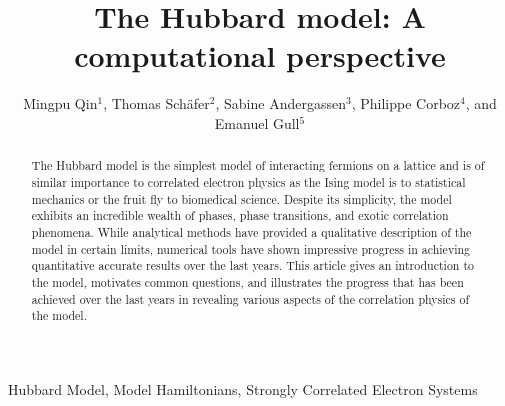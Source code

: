 \documentclass{ar-1col}
\begin{document}

\title{The Hubbard model: A computational perspective}


\author{Mingpu Qin$^1$, Thomas Sch{\"a}fer$^2$, Sabine Andergassen$^3$, Philippe Corboz$^4$, and Emanuel Gull$^5$
}


\begin{abstract}
The Hubbard model is the simplest model of interacting fermions on a lattice and is of similar importance to correlated electron physics as the Ising model is to statistical mechanics or the fruit fly to biomedical science.
Despite its simplicity, the model exhibits an incredible wealth of phases, phase transitions, and exotic correlation phenomena.
While analytical methods have provided a qualitative description of the model in certain limits, 
numerical tools have shown impressive progress in achieving quantitative accurate results over the last years.
This article gives an introduction to the model, motivates common questions, and illustrates the progress that has been achieved over the last years in revealing various aspects of the correlation physics of the model.
\end{abstract}

\begin{keywords}
Hubbard Model, Model Hamiltonians, Strongly Correlated Electron Systems
\end{keywords}
\maketitle

\tableofcontents


\end{document}
